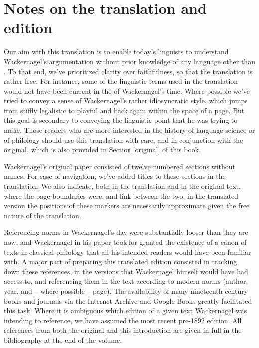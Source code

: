 \documentclass[output=paper]{../langscibook}
\begin{document}
\section{Notes on the translation and edition}\label{notes-translation}

Our aim with this translation is to enable today's linguists to understand Wackernagel's argumentation without prior knowledge of any language other than . To that end, we've prioritized clarity over faithfulness, so that the translation is rather free. For instance, some of the  linguistic terms used in the translation would not have been current in the  of Wackernagel's time. Where possible we've tried to convey a sense of Wackernagel's rather idiosyncratic style, which jumps from stiffly legalistic to playful and back again within the space of a page. But this goal is secondary to conveying the linguistic point that he was trying to make. Those readers who are more interested in the history of language science or of philology should use this translation with care, and in conjunction with the  original, which is also provided in Section \ref{original} of this book.

Wackernagel's original paper consisted of twelve numbered sections without names. For ease of navigation, we've added titles to these sections in the  translation. We also indicate, both in the translation and in the original text, where the page boundaries were, and link between the two; in the translated version the positions of these markers are necessarily approximate given the free nature of the translation.

Referencing norms in Wackernagel's day were substantially looser than they are now, and Wackernagel in his paper took for granted the existence of a canon of texts in classical philology that all his intended readers would have been familiar with. A major part of preparing this translated edition consisted in tracking down these references, in the versions that Wackernagel himself would have had access to, and referencing them in the text according to modern norms (author, year, and -- where possible -- page). The availability of many nineteenth-century books and journals via the Internet Archive and Google Books greatly facilitated this task. Where it is ambiguous which edition of a given text Wackernagel was intending to reference, we have assumed the most recent pre-1892 edition. All references from both the original and this introduction are given in full in the bibliography at the end of the volume.
\end{document}
